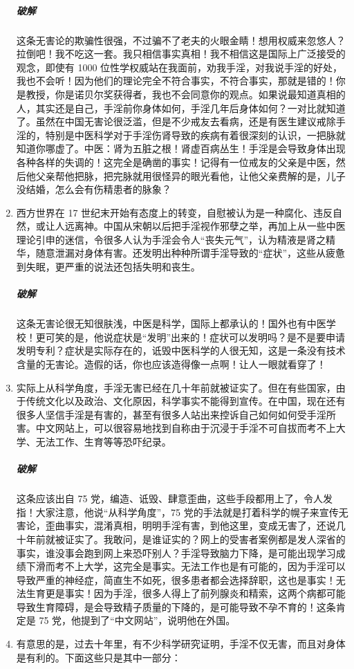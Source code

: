\documentclass{ctexart}
\begin{document}
\begin{enumerate}
    \subparagraph{破解} 这条无害论的欺骗性很强，不过骗不了老夫的火眼金睛！想用权威来忽悠人？拉倒吧！我不吃这一套。我只相信事实真相！我不相信这是国际上广泛接受的观念，即使有 1000 位性学权威站在我面前，劝我手淫，对我说手淫的好处，我也不会听！因为他们的理论完全不符合事实，不符合事实，那就是错的！你是教授，你是诺贝尔奖获得者，我也不会同意你的观点。如果说最知道真相的人，其实还是自己，手淫前你身体如何，手淫几年后身体如何？一对比就知道了。虽然在中国无害论很泛滥，但是不少戒友去看病，还是有医生建议戒除手淫的，特别是中医科学对于手淫伤肾导致的疾病有着很深刻的认识，一把脉就知道你哪虚了。中医：肾为五脏之根！肾虚百病丛生！手淫是会导致身体出现各种各样的失调的！这完全是确凿的事实！记得有一位戒友的父亲是中医，然后他父亲帮他把脉，把完脉就用很怪异的眼光看他，让他父亲费解的是，儿子没结婚，怎么会有伤精患者的脉象？
    \item 西方世界在 17 世纪末开始有态度上的转变，自慰被认为是一种腐化、违反自然，或让人远离神。中国从宋朝以后把手淫视作邪孽之举，再加上从一些中医理论引申的迷信，令很多人认为手淫会令人“丧失元气”，认为精液是肾之精华，随意泄漏对身体有害。还发明出种种所谓手淫导致的“症状”，这些从疲惫到失眠，更严重的说法还包括失明和丧生。
    \subparagraph{破解} 这条无害论很无知很肤浅，中医是科学，国际上都承认的！国外也有中医学校！更可笑的是，他说症状是“发明”出来的！症状可以发明吗？是不是要申请发明专利？症状是实际存在的，诋毁中医科学的人很无知，这是一条没有技术含量的无害论。造假的话，你也应该造得像一点啊！让人一眼就看穿了！
    \item 实际上从科学角度，手淫无害已经在几十年前就被证实了。但在有些国家，由于传统文化以及政治、文化原因，科学事实不能得到宣传。在中国，现在还有很多人坚信手淫是有害的，甚至有很多人站出来控诉自己如何如何受手淫所害。中文网站上，可以很容易地找到自称由于沉浸于手淫不可自拔而考不上大学、无法工作、生育等等恐吓纪录。
    \subparagraph{破解} 这条应该出自 75 党，编造、诋毁、肆意歪曲，这些手段都用上了，令人发指！大家注意，他说“从科学角度”，75 党的手法就是打着科学的幌子来宣传无害论，歪曲事实，混淆真相，明明手淫有害，到他这里，变成无害了，还说几十年前就被证实了。我敢问，是谁证实的？网上的受害者案例都是发人深省的事实，谁没事会跑到网上来恐吓别人？手淫导致脑力下降，是可能出现学习成绩下滑而考不上大学，这完全是事实。无法工作也是有可能的，因为手淫可以导致严重的神经症，简直生不如死，很多患者都会选择辞职，这也是事实！无法生育更是事实！因为手淫，很多人得上了前列腺炎和精索，这两个病都可能导致生育障碍，是会导致精子质量的下降的，是可能导致不孕不育的！这条肯定是 75 党，他提到了“中文网站”，说明他在外国。
    \item 有意思的是，过去十年里，有不少科学研究证明，手淫不仅无害，而且对身体是有利的。下面这些只是其中一部分：\begin{itemize}

\end{itemize}
\end{enumerate}
\end{document}
